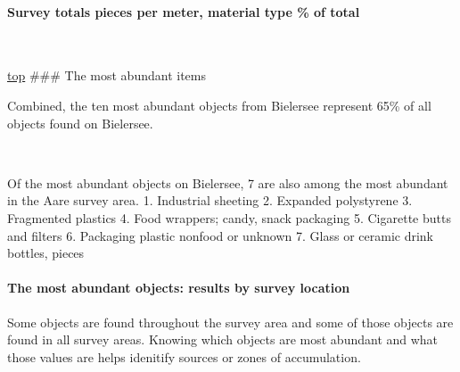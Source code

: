 \documentclass[11pt]{article}
\begin{document}
    \hypertarget{survey-totals-pieces-per-meter-material-type-of-total}{%
\paragraph{Survey totals pieces per meter, material type \% of
total}\label{survey-totals-pieces-per-meter-material-type-of-total}}

    \begin{center}
    \end{center}
    { \hspace*{\fill} \\}
    
    \hyperref[top]{top} \#\#\# The most abundant items
 
            
    
    Combined, the ten most abundant objects from Bielersee represent 65\% of
all objects found on Bielersee.

    

    \begin{center}
    \end{center}
    { \hspace*{\fill} \\}
     
            
    
    Of the most abundant objects on Bielersee, 7 are also among the most
abundant in the Aare survey area. 1. Industrial sheeting 2. Expanded
polystyrene 3. Fragmented plastics 4. Food wrappers; candy, snack
packaging 5. Cigarette butts and filters 6. Packaging plastic nonfood or
unknown 7. Glass or ceramic drink bottles, pieces

    

    \hypertarget{the-most-abundant-objects-results-by-survey-location}{%
\paragraph{The most abundant objects: results by survey
location}\label{the-most-abundant-objects-results-by-survey-location}}

Some objects are found throughout the survey area and some of those
objects are found in all survey areas. Knowing which objects are most
abundant and what those values are helps idenitify sources or zones of
accumulation.
\end{document}

